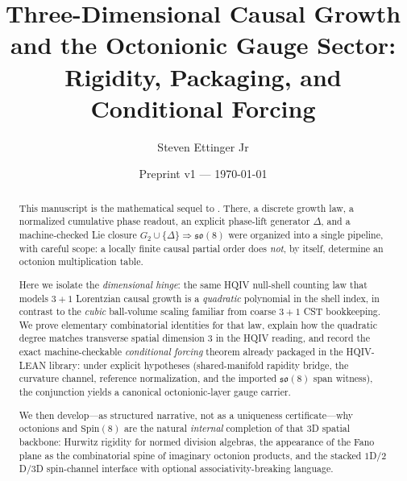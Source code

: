\documentclass[11pt]{amsart}
\title[Three-Dimensional Causal Growth and Octonionic Gauge]{Three-Dimensional Causal Growth\\
and the Octonionic Gauge Sector:\\
Rigidity, Packaging, and Conditional Forcing}
\author{Steven Ettinger Jr}
\date{Preprint v1 --- \today}
\begin{document}
\begin{abstract}
This manuscript is the mathematical sequel to \cite{hqiv-so8-paper}. There, a discrete growth law, a normalized cumulative phase readout, an explicit phase-lift generator \(\Delta\), and a machine-checked Lie closure \(G_2\cup\{\Delta\}\Rightarrow\mathfrak{so}(8)\) were organized into a single pipeline, with careful scope: a locally finite causal partial order does \emph{not}, by itself, determine an octonion multiplication table.

Here we isolate the \emph{dimensional hinge}: the same HQIV null-shell counting law that models \(3{+}1\) Lorentzian causal growth is a \emph{quadratic} polynomial in the shell index, in contrast to the \emph{cubic} ball-volume scaling familiar from coarse \(3{+}1\) CST bookkeeping. We prove elementary combinatorial identities for that law, explain how the quadratic degree matches transverse spatial dimension \(3\) in the HQIV reading, and record the exact machine-checkable \emph{conditional forcing} theorem already packaged in the HQIV-LEAN library: under explicit hypotheses (shared-manifold rapidity bridge, the curvature channel, reference normalization, and the imported \(\mathfrak{so}(8)\) span witness), the conjunction yields a canonical octonionic-layer gauge carrier.

We then develop---as structured narrative, not as a uniqueness certificate---why octonions and \(\mathrm{Spin}(8)\) are the natural \emph{internal} completion of that \(3\)D spatial backbone: Hurwitz rigidity for normed division algebras, the appearance of the Fano plane as the combinatorial spine of imaginary octonion products, and the stacked \(1\)D/\(2\)D/\(3\)D spin-channel interface with optional associativity-breaking language.


\end{abstract}
\end{document}

